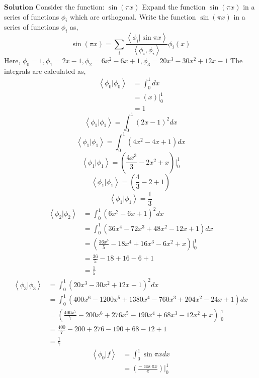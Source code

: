\documentclass{article}
\begin{document}
\begin{flushleft}
$\boxed{\textbf{Solution}}$ Consider the function:
$\sin (\pi x)$
Expand the function $\sin (\pi x)$ in a series of functions $\phi_{i}$ which are orthogonal. Write the function $\sin (\pi x)$ in a series of functions $\phi_{i}$ as,
$$
\sin (\pi x)=\sum_{i} \frac{\left\langle\phi_{i} | \sin \pi x\right\rangle}{\left\langle\phi_{i}, \phi_{i}\right\rangle} \phi_{i}(x)
$$
Here, $\phi_{0}=1, \phi_{1}=2 x-1, \phi_{2}=6 x^{2}-6 x+1, \phi_{3}=20 x^{3}-30 x^{2}+12 x-1$
The integrals are calculated as,
$$
\begin{aligned}
\left\langle\phi_{0} | \phi_{0}\right\rangle &=\int_{0}^{1} d x \\
&=(x)\Big|_{0}^{1} \\
&=1
\end{aligned}
$$
$$
\left\langle\phi_{1} | \phi_{1}\right\rangle=\int_{0}^{1}(2 x-1)^{2} d x
$$
$$\left\langle\phi_{1} | \phi_{1}\right\rangle=\int_{0}^{1}\left(4 x^{2}-4 x+1\right) d x$$
$$\left\langle\phi_{1} | \phi_{1}\right\rangle=\left(\frac{4 x^{3}}{3}-2 x^{2}+x\right)\Bigg|_{0}^{1}$$
$$\left\langle\phi_{1} | \phi_{1}\right\rangle=\left(\frac{4}{3}-2+1\right)$$
$$\left\langle\phi_{1} | \phi_{1}\right\rangle=\frac{1}{3}$$
$$
\begin{aligned}
\left\langle\phi_{2} | \phi_{2}\right\rangle &=\int_{0}^{1}\left(6 x^{2}-6 x+1\right)^{2} d x \\
&=\int_{0}^{1}\left(36 x^{4}-72 x^{3}+48 x^{2}-12 x+1\right) d x \\
&=\left(\frac{36 x^{5}}{5}-18 x^{4}+16 x^{3}-6 x^{2}+x\right)\Bigg|_{0}^{1} \\
&=\frac{36}{5}-18+16-6+1 \\
&=\frac{1}{5}
\end{aligned}
$$
$$
\begin{aligned}
\left\langle\phi_{3} | \phi_{3}\right\rangle &=\int_{0}^{1}\left(20 x^{3}-30 x^{2}+12 x-1\right)^{2} d x \\
&=\int_{0}^{1}\left(400 x^{6}-1200 x^{5}+1380 x^{4}-760 x^{3}+204 x^{2}-24 x+1\right) d x \\
&=\left(\frac{400 x^{7}}{7}-200 x^{6}+276 x^{5}-190 x^{4}+68 x^{3}-12 x^{2}+x\right)\Bigg|_{0}^{1} \\
&=\frac{400}{7}-200+276-190+68-12+1 \\
&=\frac{1}{7}
\end{aligned}
$$
$$
\begin{aligned}
\left\langle\phi_{0} | f\right\rangle &=\int_{0}^{1} \sin \pi x d x \\
&=\left(\frac{-\cos \pi x}{\pi}\right)\Bigg|_{0}^{1} \\

\end{aligned}$$
\end{flushleft}
\end{document}
